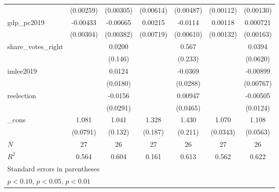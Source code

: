 {\begin{tabular}{l*{6}{c}}
            &   (0.00259)         &   (0.00305)         &   (0.00614)         &   (0.00487)         &   (0.00112)         &   (0.00130)         \\
[1em]
gdp\_pc2019  &    -0.00433         &    -0.00665         &     0.00215         &     -0.0114\sym{*}  &     0.00118         &    0.000721         \\
            &   (0.00304)         &   (0.00382)         &   (0.00719)         &   (0.00610)         &   (0.00132)         &   (0.00163)         \\
[1em]
share\_votes\_right&                     &      0.0200         &                     &       0.567\sym{**} &                     &      0.0394         \\
            &                     &     (0.146)         &                     &     (0.233)         &                     &    (0.0620)         \\
[1em]
imlee2019   &                     &      0.0124         &                     &     -0.0369         &                     &    -0.00899         \\
            &                     &    (0.0180)         &                     &    (0.0288)         &                     &   (0.00767)         \\
[1em]
reelection  &                     &     -0.0156         &                     &     0.00947         &                     &    -0.00505         \\
            &                     &    (0.0291)         &                     &    (0.0465)         &                     &    (0.0124)         \\
[1em]
\_cons      &       1.081\sym{***}&       1.041\sym{***}&       1.328\sym{***}&       1.430\sym{***}&       1.070\sym{***}&       1.108\sym{***}\\
            &    (0.0791)         &     (0.132)         &     (0.187)         &     (0.211)         &    (0.0343)         &    (0.0563)         \\
\hline
\(N\)       &          27         &          26         &          27         &          26         &          27         &          26         \\
\(R^{2}\)   &       0.564         &       0.604         &       0.161         &       0.613         &       0.562         &       0.622         \\
\hline\hline
\multicolumn{7}{l}{\footnotesize Standard errors in parentheses}\\
\multicolumn{7}{l}{\footnotesize \sym{*} \(p<0.10\), \sym{**} \(p<0.05\), \sym{***} \(p<0.01\)}\\
\end{tabular}
}

